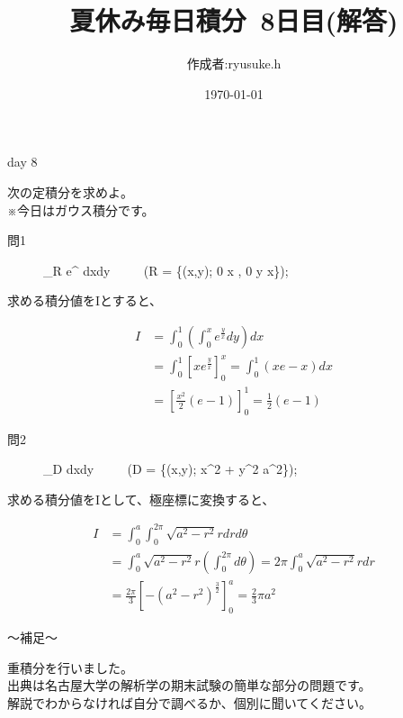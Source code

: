 \documentclass[12pt,a4paper]{jsarticle}
\title{夏休み毎日積分~8日目(解答)}
\date{\today}
\begin{document}
\maketitle

\begin{flushright}
    \author{作成者:ryusuke.h}
\end{flushright}

\begin{itembox}{day 8 }
    \begin{center}
        次の定積分を求めよ。\\
        ※今日はガウス積分です。
    \end{center}
\end{itembox}

\begin{description}
    \item [問1] {\displaystyle} \iint_R e^{} dxdy ~~~~ (R = \{(x,y); 0 \leq x , 0 \leqq y \leqq x\}); \\
\end{description}

求める積分値をIとすると、

\begin{align*}
    I &= \int_0^1 \left( \int_0^x e^\frac{y}{x} dy\right) dx \\
    &= \int_0^1 \left[ xe^\frac{y}{x}\right]_0^x = \int_0^1 (xe - x) dx \\
    &= \left[ \frac{x^2}{2}(e - 1)\right]_0^1 = \frac{1}{2}(e - 1)
\end{align*}

\begin{description}
    \item [問2] {\displaystyle} \iint_D  dxdy ~~~~ (D = \{(x,y); x^2 + y^2 \leqq a^2\}); \\
\end{description}

求める積分値をIとして、極座標に変換すると、

\begin{align*}
    I &= \int_0^a\int_0^{2\pi} \sqrt{a^2 - r^2} rdrd\theta \\
    &= \int_0^a \sqrt{a^2 - r^2} r \left(\int_0^{2\pi} d\theta \right) = 2\pi \int_0^a \sqrt{a^2 - r^2}rdr \\
    &= \frac{2\pi}{3}\left[ - \left(a^2 - r^2\right)^\frac{3}{2}\right]_0^a = \frac{2}{3}{\pi}a^2
\end{align*}

\begin{boxnote}
    〜補足〜
    \begin{center}
        重積分を行いました。\\
        出典は名古屋大学の解析学の期末試験の簡単な部分の問題です。\\
        解説でわからなければ自分で調べるか、個別に聞いてください。
    \end{center}
\end{boxnote}
\end{document}
